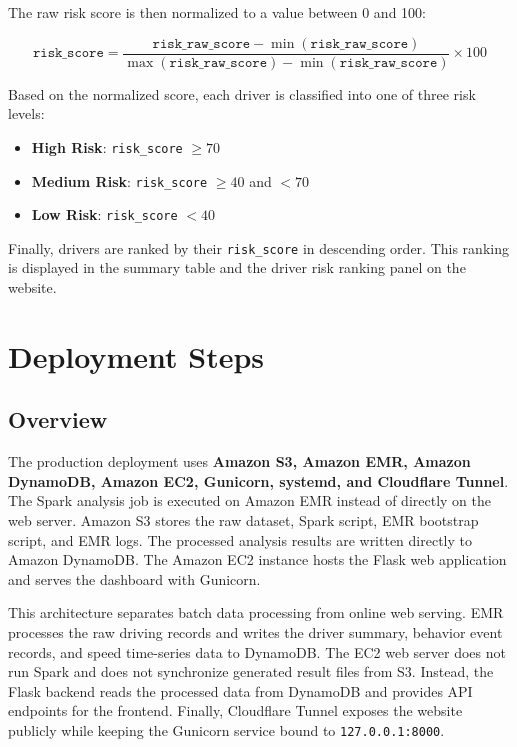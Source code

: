 \documentclass[12pt,a4paper]{article}
\begin{document}
The raw risk score is then normalized to a value between 0 and 100:

\[
\texttt{risk\_score}
=
\frac{
\texttt{risk\_raw\_score} - \min(\texttt{risk\_raw\_score})
}{
\max(\texttt{risk\_raw\_score}) - \min(\texttt{risk\_raw\_score})
}
\times 100
\]

Based on the normalized score, each driver is classified into one of three risk levels:

\begin{itemize}
    \item \textbf{High Risk}: \texttt{risk\_score} $\geq 70$
    \item \textbf{Medium Risk}: \texttt{risk\_score} $\geq 40$ and $< 70$
    \item \textbf{Low Risk}: \texttt{risk\_score} $< 40$
\end{itemize}

Finally, drivers are ranked by their \texttt{risk\_score} in descending order. This ranking is displayed in the summary table and the driver risk ranking panel on the website.


\section{Deployment Steps}

\subsection{Overview}

The production deployment uses \textbf{Amazon S3, Amazon EMR, Amazon DynamoDB, Amazon EC2, Gunicorn, systemd, and Cloudflare Tunnel}. The Spark analysis job is executed on Amazon EMR instead of directly on the web server. Amazon S3 stores the raw dataset, Spark script, EMR bootstrap script, and EMR logs. The processed analysis results are written directly to Amazon DynamoDB. The Amazon EC2 instance hosts the Flask web application and serves the dashboard with Gunicorn.

This architecture separates batch data processing from online web serving. EMR processes the raw driving records and writes the driver summary, behavior event records, and speed time-series data to DynamoDB. The EC2 web server does not run Spark and does not synchronize generated result files from S3. Instead, the Flask backend reads the processed data from DynamoDB and provides API endpoints for the frontend. Finally, Cloudflare Tunnel exposes the website publicly while keeping the Gunicorn service bound to \texttt{127.0.0.1:8000}.
\end{document}
